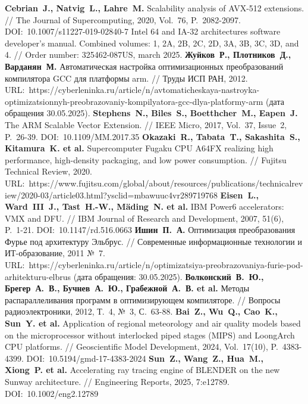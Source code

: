 \begin{thebibliography}{99}
\textbf{Cebrian~J., Natvig~L., Lahre~M.} Scalability analysis of AVX-512 extensions. // The Journal of Supercomputing, 2020, Vol.~76, P.~2082-2097. DOI:~10.1007/s11227-019-02840-7
Intel 64 and IA-32 architectures software developer's manual. Combined volumes: 1, 2A, 2B, 2C, 2D, 3A, 3B, 3C, 3D, and 4. // Order number: 325462-087US, march 2025.
\textbf{Жуйков~Р., Плотников~Д., Варданян~М.} Автоматическая настройка оптимизационных преобразований компилятора GCC для платформы arm. // Труды ИСП РАН, 2012. URL:~https://cyberleninka.ru/article/n/avtomaticheskaya-nastroyka-optimizatsionnyh-preobrazovaniy-kompilyatora-gcc-dlya-platformy-arm (дата обращения 30.05.2025).
\textbf{Stephens~N., Biles~S., Boetthcher~M., Eapen~J.} The ARM Scalable Vector Extension. // IEEE Micro, 2017, Vol.~37, Issue~2, P.~26-39. DOI:~10.1109/MM.2017.35
\textbf{Okazaki~R., Tabata~T., Sakashita~S., Kitamura~K. et al.} Supercomputer Fugaku CPU A64FX realizing high performance, high-density packaging, and low power consumption. // Fujitsu Technical Review, 2020. URL:~https://www.fujitsu.com/global/about/resources/publications/technicalreview/2020-03/article03.html?ysclid=mbawuuc4vr289719768
\textbf{Eisen~L., Ward~III~J., Tast~H.-W., M{\"a}ding~N. et al.} IBM Power6 accelerators: VMX and DFU. // IBM Journal of Research and Development, 2007, 51(6), P.~1-21. DOI:~10.1147/rd.516.0663
\textbf{Ишин~П.~А.} Оптимизация преобразования Фурье под архитектуру Эльбрус. // Современные информационные технологии и ИТ-образование, 2011 №~7. URL:~https://cyberleninka.ru/article/n/optimizatsiya-preobrazovaniya-furie-pod-arhitekturu-elbrus (дата обращения: 30.05.2025).
\textbf{Волконский~В.~Ю., Брегер~А.~В., Бучнев~А.~Ю., Грабежной~А.~В. et al.} Методы распараллеливания программ в оптимизирующем компиляторе. // Вопросы радиоэлектроники, 2012, Т.~4, №~3, С.~63-88.
\textbf{Bai~Z., Wu~Q., Cao~K., Sun~Y. et al.} Application of regional meteorology and air quality models based on the microprocessor without interlocked piped stages (MIPS) and LoongArch CPU platforms. // Geoscientific Model Development, 2024, Vol.~17(10), P.~4383-4399. DOI:~10.5194/gmd-17-4383-2024
\textbf{Sun~Z., Wang~Z., Hua~M., Xiong~P. et al.} Accelerating ray tracing engine of BLENDER on the new Sunway architecture. // Engineering Reports, 2025, 7:e12789. DOI:~10.1002/eng2.12789


\end{thebibliography}
